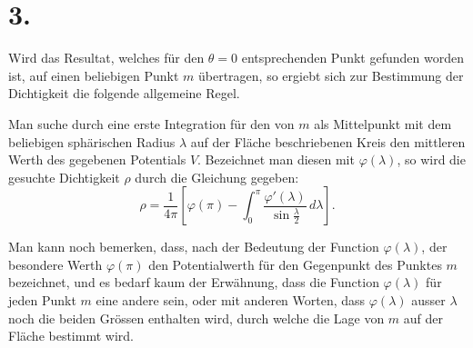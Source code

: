 \documentclass[11pt]{article}
\newcommand{\dd}{\,d}
\begin{document}
\section*{3.}

Wird das Resultat, welches für den $\theta=0$ entsprechenden Punkt gefunden worden ist, auf einen beliebigen Punkt $m$ übertragen, so ergiebt sich zur Bestimmung der Dichtigkeit die folgende allgemeine Regel.

Man suche durch eine erste Integration für den von $m$ als Mittelpunkt mit dem beliebigen sphärischen Radius $\lambda$ auf der Fläche beschriebenen Kreis den mittleren Werth des gegebenen Potentials $V$. Bezeichnet man diesen mit $\varphi(\lambda)$, so wird die gesuchte Dichtigkeit $\rho$ durch die Gleichung gegeben:
\[
 \rho=\frac1{4\pi}\left[\varphi(\pi)-\int_0^\pi\frac{\varphi'(\lambda)}{\sin\frac{\lambda}{2}}\dd\lambda\right].
\]

Man kann noch bemerken, dass, nach der Bedeutung der Function $\varphi(\lambda)$, der besondere Werth $\varphi(\pi)$ den Potentialwerth für den Gegenpunkt des Punktes $m$ bezeichnet, und es bedarf kaum der Erwähnung, dass die Function $\varphi(\lambda)$ für jeden Punkt $m$ eine andere sein, oder mit anderen Worten, dass $\varphi(\lambda)$ ausser $\lambda$ noch die beiden Grössen enthalten wird, durch welche die Lage von $m$ auf der Fläche bestimmt wird.
\end{document}
